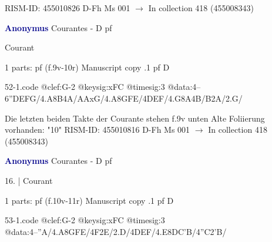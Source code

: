 \documentclass[twocolumn]{book}
\begin{document}
\newline RISM-ID: 455010826
\newline D-Fh  Ms 001
\newline $\rightarrow$ In collection 418 (455008343)
      
\newline \par \vspace{7pt} \textcolor{darkblue}{\textbf{Anonymus  }}
\newline Courantes - D
\newline pf
\newline \begin{itshape}[f.10r, at left:] Courant\end{itshape} 
\newline \textcolor{darkblue}{}  1 parts: pf  (f.9v-10r)
\newline Manuscript copy
.1  pf  D  
\begin{filecontents*}{52-1.code}
@clef:G-2
@keysig:xFC
@timesig:3
@data:4--{6''DEFG}/4.A8B4A/AAxG/4.A{8GFE}/4DEF/4.G8A4B/B2A/2.G/
\end{filecontents*}
\newline
%

\newline Die letzten beiden Takte der Courante stehen f.9v unten
\newline Alte Foliierung vorhanden: "10"
\newline RISM-ID: 455010816
\newline D-Fh  Ms 001
\newline $\rightarrow$ In collection 418 (455008343)
      
\newline \par \vspace{7pt} \textcolor{darkblue}{\textbf{Anonymus  }}
\newline Courantes - D
\newline pf
\newline \begin{itshape}[f.10v, at left:] 16. | Courant\end{itshape} 
\newline \textcolor{darkblue}{}  1 parts: pf  (f.10v-11r)
\newline Manuscript copy
.1  pf  D  
\begin{filecontents*}{53-1.code}
@clef:G-2
@keysig:xFC
@timesig:3
@data:4--''A/4.A{8GFE}/4F2E/2.D/4DEF/4.E{8DC'B}/4''C2'B/
\end{filecontents*}
\newline
%
\end{document}
